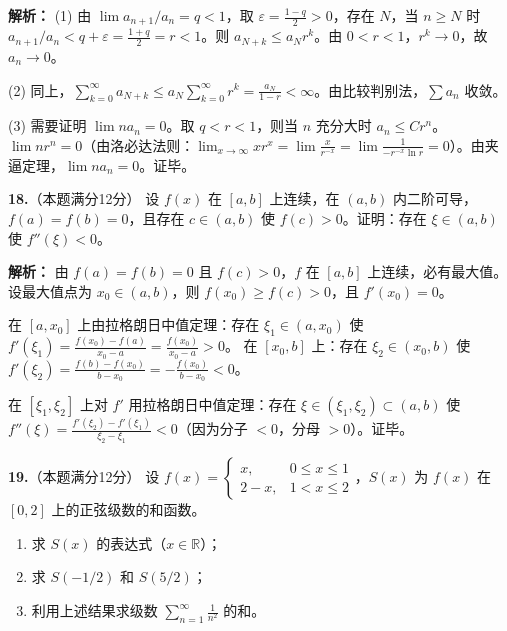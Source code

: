 \ifshowsolutions\par\noindent\textbf{解析：} (1) 由 $\lim a_{n+1}/a_n=q<1$，取 $\varepsilon=\frac{1-q}{2}>0$，存在 $N$，当 $n\geqslant N$ 时 $a_{n+1}/a_n<q+\varepsilon=\frac{1+q}{2}=r<1$。则 $a_{N+k}\leqslant a_N r^k$。由 $0<r<1$，$r^k\to0$，故 $a_n\to0$。

(2) 同上，$\sum_{k=0}^{\infty} a_{N+k} \leqslant a_N\sum_{k=0}^{\infty} r^k = \frac{a_N}{1-r}<\infty$。由比较判别法，$\sum a_n$ 收敛。

(3) 需要证明 $\lim n a_n = 0$。取 $q<r<1$，则当 $n$ 充分大时 $a_n \leqslant C r^n$。$\lim n r^n = 0$（由洛必达法则：$\lim_{x\to\infty} x r^x = \lim\frac{x}{r^{-x}} = \lim\frac{1}{-r^{-x}\ln r} = 0$）。由夹逼定理，$\lim n a_n = 0$。证毕。\else \answerarea[8] \fi

\vspace{8pt}

\textbf{18.}（本题满分12分）
设 $f(x)$ 在 $[a,b]$ 上连续，在 $(a,b)$ 内二阶可导，$f(a)=f(b)=0$，且存在 $c\in(a,b)$ 使 $f(c)>0$。证明：存在 $\xi\in(a,b)$ 使 $f''(\xi)<0$。

\ifshowsolutions\par\noindent\textbf{解析：} 由 $f(a)=f(b)=0$ 且 $f(c)>0$，$f$ 在 $[a,b]$ 上连续，必有最大值。设最大值点为 $x_0\in(a,b)$，则 $f(x_0)\geqslant f(c)>0$，且 $f'(x_0)=0$。

在 $[a,x_0]$ 上由拉格朗日中值定理：存在 $\xi_1\in(a,x_0)$ 使 $f'(\xi_1)=\frac{f(x_0)-f(a)}{x_0-a}=\frac{f(x_0)}{x_0-a}>0$。
在 $[x_0,b]$ 上：存在 $\xi_2\in(x_0,b)$ 使 $f'(\xi_2)=\frac{f(b)-f(x_0)}{b-x_0}=-\frac{f(x_0)}{b-x_0}<0$。

在 $[\xi_1,\xi_2]$ 上对 $f'$ 用拉格朗日中值定理：存在 $\xi\in(\xi_1,\xi_2)\subset(a,b)$ 使
$f''(\xi) = \frac{f'(\xi_2)-f'(\xi_1)}{\xi_2-\xi_1} < 0$（因为分子 $<0$，分母 $>0$）。证毕。\else \answerarea[8] \fi

\vspace{8pt}

\textbf{19.}（本题满分12分）
设 $f(x)=\begin{cases}x,&0\leqslant x\leqslant1\\2-x,&1<x\leqslant2\end{cases}$，$S(x)$ 为 $f(x)$ 在 $[0,2]$ 上的正弦级数的和函数。
\begin{enumerate}
    \item[(1)] 求 $S(x)$ 的表达式（$x\in\mathbb{R}$）；
    \item[(2)] 求 $S(-1/2)$ 和 $S(5/2)$；
    \item[(3)] 利用上述结果求级数 $\displaystyle\sum_{n=1}^{\infty}\frac{1}{n^2}$ 的和。
\end{enumerate}

